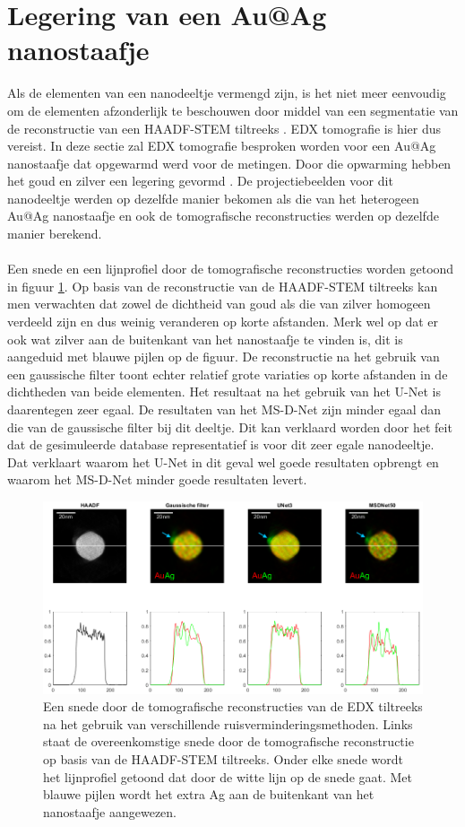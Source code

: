 \documentclass{report}
\begin{document}
\section{Legering van een Au@Ag nanostaafje} \label{ch:tomo_alloy}
Als de elementen van een nanodeeltje vermengd zijn, is het niet meer eenvoudig om de elementen afzonderlijk te beschouwen door middel van een segmentatie van de reconstructie van een HAADF-STEM tiltreeks \cite{paper:alloysegmentation}. EDX tomografie is hier dus vereist. In deze sectie zal EDX tomografie besproken worden voor een Au@Ag nanostaafje dat opgewarmd werd voor de metingen. Door die opwarming hebben het goud en zilver een legering gevormd \cite{paper:alloys}. De projectiebeelden voor dit nanodeeltje werden op dezelfde manier bekomen als die van het heterogeen Au@Ag nanostaafje en ook de tomografische reconstructies werden op dezelfde manier berekend.
\\ \\
Een snede en een lijnprofiel door de tomografische reconstructies worden getoond in figuur \ref{fig:tomo_alloy}. Op basis van de reconstructie van de HAADF-STEM tiltreeks kan men verwachten dat zowel de dichtheid van goud als die van zilver homogeen verdeeld zijn en dus weinig veranderen op korte afstanden. Merk wel op dat er ook wat zilver aan de buitenkant van het nanostaafje te vinden is, dit is aangeduid met blauwe pijlen op de figuur. De reconstructie na het gebruik van een gaussische filter toont echter relatief grote variaties op korte afstanden in de dichtheden van beide elementen. Het resultaat na het gebruik van het U-Net is daarentegen zeer egaal. De resultaten van het MS-D-Net zijn minder egaal dan die van de gaussische filter bij dit deeltje. Dit kan verklaard worden door het feit dat de gesimuleerde database representatief is voor dit zeer egale nanodeeltje. Dat verklaart waarom het U-Net in dit geval wel goede resultaten opbrengt en waarom het MS-D-Net minder goede resultaten levert.
\begin{figure}[h!]
	\centering
	\includegraphics[width=15cm]{images/tomo/alloy.png}
	\caption{Een snede door de tomografische reconstructies van de EDX tiltreeks na het gebruik van verschillende ruisverminderingsmethoden. Links staat de overeenkomstige snede door de tomografische reconstructie op basis van de HAADF-STEM tiltreeks. Onder elke snede wordt het lijnprofiel getoond dat door de witte lijn op de snede gaat. Met blauwe pijlen wordt het extra Ag aan de buitenkant van het nanostaafje aangewezen.}
	\label{fig:tomo_alloy}
\end{figure}
\end{document}
